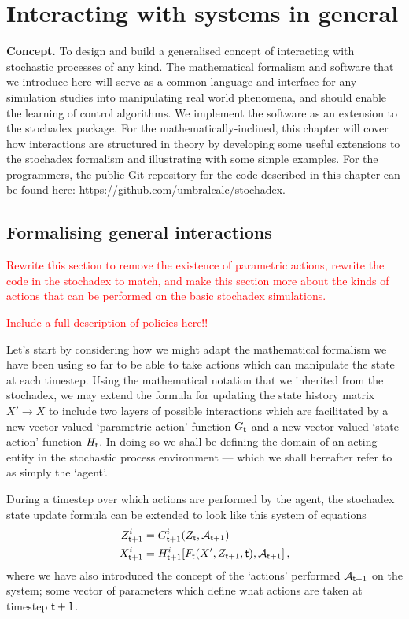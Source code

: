 \chapter{\sffamily Interacting with systems in general}

{\bfseries\sffamily Concept.} To design and build a generalised concept of interacting with stochastic processes of any kind. The mathematical formalism and software that we introduce here will serve as a common language and interface for any simulation studies into manipulating real world phenomena, and should enable the learning of control algorithms. We implement the software as an extension to the stochadex package. For the mathematically-inclined, this chapter will cover how interactions are structured in theory by developing some useful extensions to the stochadex formalism and illustrating with some simple examples. For the programmers, the public Git repository for the code described in this chapter can be found here: \href{https://github.com/umbralcalc/stochadex}{https://github.com/umbralcalc/stochadex}.

\section{\sffamily Formalising general interactions}

\textcolor{red}{Rewrite this section to remove the existence of parametric actions, rewrite the code in the stochadex to match, and make this section more about the kinds of actions that can be performed on the basic stochadex simulations.}

\textcolor{red}{Include a full description of policies here!!}

Let's start by considering how we might adapt the mathematical formalism we have been using so far to be able to take actions which can manipulate the state at each timestep. Using the mathematical notation that we inherited from the stochadex, we may extend the formula for updating the state history matrix $X'\rightarrow X$ to include two layers of possible interactions which are facilitated by a new vector-valued `parametric action' function $G_{{\sf t}}$ and a new vector-valued `state action' function $H_{{\sf t}}$. In doing so we shall be defining the domain of an acting entity in the stochastic process environment --- which we shall hereafter refer to as simply the `agent'.

During a timestep over which actions are performed by the agent, the stochadex state update formula can be extended to look like this system of equations
\begin{align}
Z_{{\sf t}+1}^i &= G_{{\sf t}+1}^i(Z_{{\sf t}}, {\cal A}_{{\sf t}+1}) \label{eq:generalised-param-actions} \\
X_{{\sf t}+1}^i &= H^i_{{\sf t}+1}[F_{\sf t}(X', Z_{{\sf t}+1}, {\sf t}), {\cal A}_{{\sf t}+1}] \label{eq:generalised-state-actions} \,,
\end{align}
where we have also introduced the concept of the `actions' performed ${\cal A}_{{\sf t}+1}$ on the system; some vector of parameters which define what actions are taken at timestep ${\sf t}+1$.

